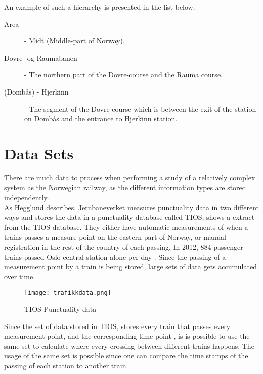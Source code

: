 \bigskip
An example of such a hierarchy is presented in the list below.

\begin{description}
	\item [Area] - Midt (Middle-part of Norway).
	\item [Dovre- og Raumabanen] - The northern part of the Dovre-course and the
	Rauma course.
	\item [(Dombås) - Hjerkinn] - The segment of the Dovre-course which is 
	between the exit of the station on Dombås and the entrance to Hjerkinn
	station.
\end{description}


\section{Data Sets} %
\label{sec:back_data_sets}
There are much data to process when performing a study of a relatively complex 
system as the Norwegian railway, as the different information types are stored
independently.\\

As Hegglund\cite[pp. 10-11]{hegglundPunklighetsdataIJernbanetraffik} describes,
Jernbaneverket measures punctuality data in two different ways and stores the
data in a punctuality database called TIOS,  shows a extract from the TIOS database. They either have automatic measurements of when a 
trains passes a measure point on the eastern part of Norway, or manual 
registration in the rest of the country of each passing. In 2012,  884 passenger trains passed Oslo central station alone per day \cite[p. 12]{jernbaneverketStatistikk}.
Since the passing of a measurement point by a train is being stored, large sets
of data gets accumulated over time.

\begin{figure}[!htbp]
	\texttt{[image: trafikkdata.png]}
	\caption[TIOS Punctuality data]{TIOS Punctuality data \cite{sintefPresis}}
	\label{fig:jernbaneverket-trafikkdata}
\end{figure}

Since the set of data stored in TIOS, stores every train that passes every 
measurement point, and the corresponding time point , is is possible
to use the same set to calculate where every crossing between different trains
happens. The usage of the same set is possible since one can compare the time 
stamps of the passing of each station to another train.\\

